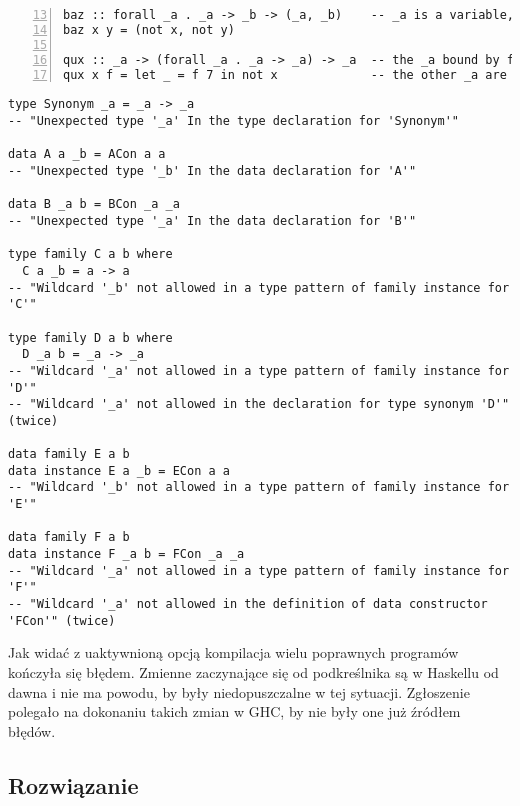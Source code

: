 \begin{lstlisting}[float,numbers=left,firstnumber=13,label={lst:namedwcs_explicit_forall},
                   caption={Fragment testu \code{NamedWildcardExplicitForall} sprawdzającego, czy zmienne związane kwantyfikatorem nie zostają zamienione w wieloznaczniki.}]
baz :: forall _a . _a -> _b -> (_a, _b)    -- _a is a variable, _b is a wildcard
baz x y = (not x, not y)

qux :: _a -> (forall _a . _a -> _a) -> _a  -- the _a bound by forall is a tyvar
qux x f = let _ = f 7 in not x             -- the other _a are wildcards
\end{lstlisting}

\begin{lstlisting}[float,label={lst:namedwcs_not_allowed},
                   caption={Deklaracje, w których kompilacja kończyła się błędem, przy aktywnym rozszerzeniu \code{NamedWildCards}.}]
type Synonym _a = _a -> _a
-- "Unexpected type '_a' In the type declaration for 'Synonym'"

data A a _b = ACon a a
-- "Unexpected type '_b' In the data declaration for 'A'"

data B _a b = BCon _a _a
-- "Unexpected type '_a' In the data declaration for 'B'"

type family C a b where
  C a _b = a -> a
-- "Wildcard '_b' not allowed in a type pattern of family instance for 'C'"

type family D a b where
  D _a b = _a -> _a
-- "Wildcard '_a' not allowed in a type pattern of family instance for 'D'"
-- "Wildcard '_a' not allowed in the declaration for type synonym 'D'" (twice)

data family E a b
data instance E a _b = ECon a a
-- "Wildcard '_b' not allowed in a type pattern of family instance for 'E'"

data family F a b
data instance F _a b = FCon _a _a
-- "Wildcard '_a' not allowed in a type pattern of family instance for 'F'"
-- "Wildcard '_a' not allowed in the definition of data constructor 'FCon'" (twice)
\end{lstlisting}

Jak widać z uaktywnioną opcją  kompilacja wielu poprawnych
programów kończyła się błędem. Zmienne zaczynające się od podkreślnika są w
Haskellu od dawna i nie ma powodu, by były niedopuszczalne w tej
sytuacji. Zgłoszenie polegało na dokonaniu takich zmian w GHC, by nie były one
już źródłem błędów.

\subsection{Rozwiązanie} %

